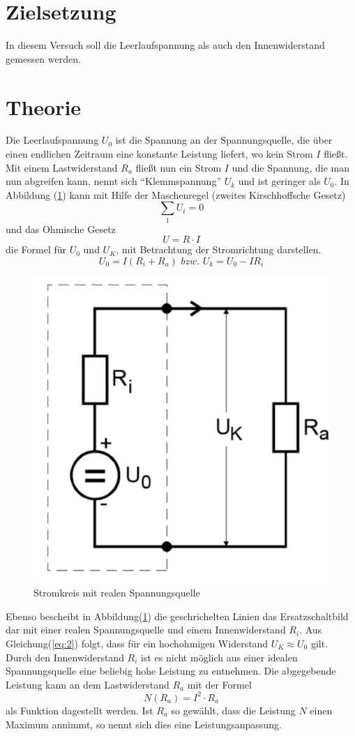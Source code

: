 \section{Zielsetzung}
In diesem Versuch soll die Leerlaufspannung als auch den Innenwiderstand gemessen werden.

\section{Theorie}
Die Leerlaufspannung $U_0$ ist die Spannung an der Spannungsquelle, die über einen endlichen Zeitraum eine konstante
Leistung liefert, wo kein Strom $I$ fließt.
Mit einem Lastwiderstand $R_a$ fließt nun ein Strom $I$ und die Spannung, die man nun abgreifen kann,
nennt sich \enquote{Klemmspannung} $U_k$ und ist geringer als $U_0$.
In Abbildung (\ref{abb:1}) kann mit Hilfe der Maschenregel (zweites Kirschhoffsche Gesetz)
\begin{equation*}
  \sum_1 U_i = 0
\end{equation*}
und das Ohmische Gesetz
\begin{equation}
  U = R \cdot I
  \label{eq:1}
\end{equation}
die Formel für $U_0$ und $U_K$, mit Betrachtung der Stromrichtung darstellen.
\begin{equation}
  U_0= I (R_i + R_a) \,\, bzw. \,\, U_k=U_0 - I R_i
  \label{eq:2}
\end{equation}
\begin{figure}[H]
  \centering
  \includegraphics[width=10 cm, height= 7 cm]{Bild1.png}
  \caption{Stromkreis mit realen Spannungsquelle \cite{1}}
  \label{abb:1}
\end{figure}
Ebenso bescheibt in Abbildung(\ref{abb:1}) die geschrichelten Linien das Ersatzschaltbild dar
mit einer realen Spannungsquelle und einem Innenwiderstand $R_i$.
Aus Gleichung(\ref{eq:2}) folgt, dass für ein hochohmigen Widerstand $U_K \approx U_0$ gilt.\\
Durch den Innenwiderstand $R_i$  ist es nicht möglich aus einer idealen Spannungsquelle eine beliebig
hohe Leistung zu entnehmen. Die abgegebende Leistung kann an dem Lastwiderstand $R_a$ mit der Formel
\begin{equation}
  N(R_a) = I^2 \cdot R_a
  \label{eq:3}
\end{equation}
als Funktion dagestellt werden. Ist $R_a$ so gewählt, dass die Leistung $N$ einen Maximum annimmt, so nennt sich dies
eine Leistungsanpassung.
